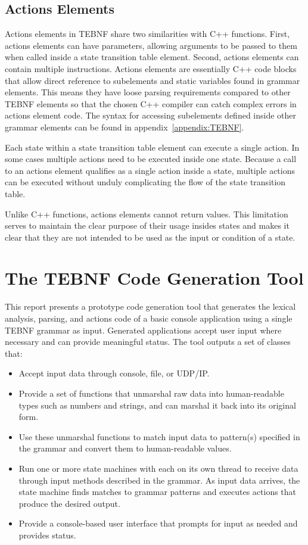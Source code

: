 \subsection{Actions Elements} \label{ssec:ActionsElements}
Actions elements in TEBNF share two similarities with C++ functions. First, actions elements can have parameters, allowing arguments to be passed to them when called inside a state transition table element.  Second, actions elements can contain multiple instructions.  Actions elements are essentially C++ code blocks that allow direct reference to subelements and static variables found in grammar elements.  This means they have loose parsing requirements compared to other TEBNF elements so that the chosen C++ compiler can catch complex errors in actions element code.  The syntax for accessing subelements defined inside other grammar elements can be found in appendix~\ref{appendix:TEBNF}.

\indent
Each state within a state transition table element can execute a single action.  In some cases multiple actions need to be executed inside one state.  Because a call to an actions element qualifies as a single action inside a state, multiple actions can be executed without unduly complicating the flow of the state transition table.

\indent
Unlike C++ functions, actions elements cannot return values.  This limitation serves to maintain the clear purpose of their usage insides states and makes it clear that they are not intended to be used as the input or condition of a state.

\section{The TEBNF Code Generation Tool}
This report presents a prototype code generation tool that generates the lexical analysis, parsing, and actions code of a basic console application using a single TEBNF grammar as input.  Generated applications accept user input where necessary and can provide meaningful status.  The tool outputs a set of classes that:
\begin{itemize}
  \item Accept input data through console, file, or UDP/IP.
  \item Provide a set of functions that unmarshal raw data into human-readable types such as numbers and strings, and can marshal it back into its original form.
  \item Use these unmarshal functions to match input data to pattern(s) specified in the grammar and convert them to human-readable values.
  \item Run one or more state machines with each on its own thread to receive data through input methods described in the grammar.  As input data arrives, the state machine finds matches to grammar patterns and executes actions that produce the desired output.
  \item Provide a console-based user interface that prompts for input as needed and provides status.
\end{itemize}

